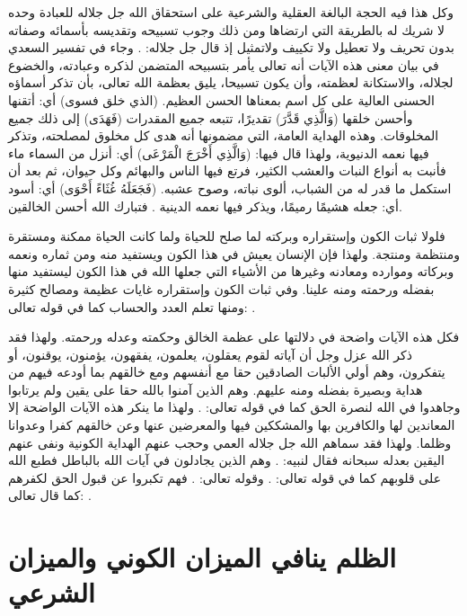 وكل هذا فيه الحجة البالغة العقلية والشرعية على استحقاق الله جل جلاله للعبادة وحده لا شريك له بالطريقة التي ارتضاها ومن ذلك وجوب تسبيحه وتقديسه بأسمائه وصفاته بدون تحريف ولا تعطيل ولا تكييف ولاتمثيل إذ قال جل جلاله: 
\quranayah*[87][1-5]{\footnotesize \surahname*[87]}.
وجاء في تفسير السعدي في بيان معنى هذه الآيات أنه تعالى يأمر بتسبيحه المتضمن لذكره وعبادته، والخضوع لجلاله، والاستكانة لعظمته، وأن يكون تسبيحا، يليق بعظمة الله تعالى، بأن تذكر أسماؤه الحسنى العالية على كل اسم بمعناها الحسن العظيم. (الذي خلق فسوى) أي: أتقنها وأحسن خلقها (وَالَّذِي قَدَّرَ) تقديرًا، تتبعه جميع المقدرات (فَهَدَى) إلى ذلك جميع المخلوقات. وهذه الهداية العامة، التي مضمونها أنه هدى كل مخلوق لمصلحته، وتذكر فيها نعمه الدنيوية، ولهذا قال فيها: (وَالَّذِي أَخْرَجَ الْمَرْعَى) أي: أنزل من السماء ماء فأنبت به أنواع النبات والعشب الكثير، فرتع فيها الناس والبهائم وكل حيوان، ثم بعد أن استكمل ما قدر له من الشباب، ألوى نباته، وصوح عشبه. (فَجَعَلَهُ غُثَاءً أَحْوَى) أي: أسود أي: جعله هشيمًا رميمًا، ويذكر فيها نعمه الدينية \cite{tafsir_Saadi}. فتبارك الله أحسن الخالقين.

فلولا ثبات الكون وإستقراره وبركته لما صلح للحياة ولما كانت الحياة ممكنة ومستقرة ومنتظمة ومنتجة. ولهذا فإن الإنسان يعيش في هذا الكون ويستفيد منه ومن ثماره ونعمه وبركاته وموارده ومعادنه وغيرها من الأشياء التي جعلها الله في هذا الكون ليستفيد منها بفضله ورحمته ومنه علينا.
وفي ثبات الكون وإستقراره غايات عظيمة ومصالح كثيرة ومنها تعلم العدد والحساب كما في قوله تعالى: 
\quranayah*[10][5]{\footnotesize \surahname*[10]}. 

فكل هذه الآيات واضحة في دلالتها على عظمة الخالق وحكمته وعدله ورحمته. ولهذا فقد ذكر الله عزل وجل أن آياته لقوم يعقلون، يعلمون، يفقهون، يؤمنون، يوقنون، أو يتفكرون، وهم أولي الألبات الصادقين حقا مع أنفسهم ومع خالقهم بما أودعه فيهم من هداية وبصيرة بفضله ومنه عليهم. وهم الذين آمنوا بالله حقا على يقين ولم يرتابوا وجاهدوا في الله لنصرة الحق كما في قوله تعالى: 
\quranayah*[49][15]{\footnotesize \surahname*[49]}.
ولهذا ما ينكر هذه الآيات الواضحة إلا المعاندين لها والكافرين بها والمشككين فيها والمعرضين عنها وعن خالقهم كفرا وعدوانا وظلما. ولهذا فقد سماهم الله جل جلاله العمي وحجب عنهم الهداية الكونية ونفى عنهم اليقين بعدله سبحانه فقال لنبيه: 
\quranayah*[27][81-82]{\footnotesize \surahname*[27]}. وهم الذين يجادلون في آيات الله بالباطل فطبع الله على قلوبهم كما في قوله تعالى:
\quranayah*[40][35]{\footnotesize \surahname*[40]}.
وقوله تعالى: 
\quranayah*[40][56]{\footnotesize \surahname*[40]}.
فهم تكبروا عن قبول الحق لكفرهم كما قال تعالى: 
\quranayah*[40][4]{\footnotesize \surahname*[40]}.


\section{الظلم ينافي الميزان الكوني والميزان الشرعي}


